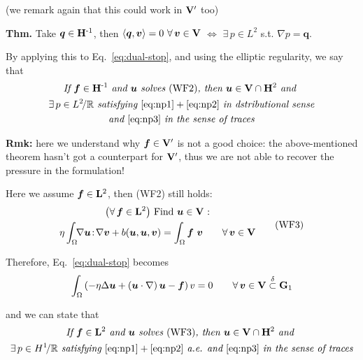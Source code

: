 {\color{blue}(we remark again that this could work in $\mathbf{V}'$ too)}

\smallskip

\textbf{Thm.} Take $\bm q\in\mathbf{H}^{\text{-}1}$, then $\left\langle \bm q,\bm v \right\rangle=0\ \forall\,\bm v\in\mathbf{V}$ $\Longleftrightarrow$ $\exists\,p\in L^2$ s.t. $\nabla p=\bm q$.

\smallskip

By applying this to Eq.~\eqref{eq:dual-stop}, and using the elliptic regularity, we say that
\begin{gather*}
\textit{If }\bm f\in\mathbf{H}^{\text{-}1} \textit{ and } \bm u \textit{ solves } \text{(WF2)} \textit{, then } \bm u\in \mathbf{V}\cap\mathbf{H}^2 \textit{ and } \\
\exists\, p\in L^2\!/\mathbb{R} \textit{ satisfying } \eqref{eq:np1}+\eqref{eq:np2}\textit{ in dstributional sense} \\
\textit{and } \eqref{eq:np3} \textit{ in the sense of traces}
\end{gather*}

{\color{blue}\textbf{Rmk:} here we understand why $\bm f\in \mathbf{V}'$ is not a good choice: the above-mentioned theorem hasn't got a counterpart for $\mathbf{V}'$, thus we are not able to recover the pressure in the formulation!}

\noindent\rlap{\rule[1.5ex]{0.495\textwidth}{.2pt}}\vspace{-0.5em}

\newcolumn

Here we assume $\bm f\in\mathbf{L}^2$, then (WF2) still holds:
\begin{equation*}
\begin{gathered}
\big(\forall\,\bm f\in\mathbf{L}^{2}\big)\text{ Find }\bm u\in \mathbf{V}\text{ :} \\ 
\eta\int_\Omega\!\! \nabla \bm u\! :\! \nabla \bm v+b(\bm u,\bm u,\bm v)=\int_\Omega\bm f\ \bm v \qquad \forall\, \bm v\in\mathbf{V}    
\end{gathered}
\tag{WF3}
\end{equation*}

Therefore, Eq.~\eqref{eq:dual-stop} becomes
\begin{equation*}
\int_\Omega \left( -\eta\Delta\bm u+ \left( \bm u\cdot\nabla \right) \bm u - \bm f \right) v =0 \qquad\forall\,\bm v\in \mathbf{V} \overset{\delta}{\subset} \mathbf{G}_1
\end{equation*}

and we can state that
\begin{gather*}
\textit{If }\bm f\in\mathbf{L}^2 \textit{ and } \bm u \textit{ solves } \text{(WF3)} \textit{, then } \bm u\in \mathbf{V}\cap\mathbf{H}^2 \textit{ and } \\
\exists\, p\in H^1\!/\mathbb{R} \textit{ satisfying } \eqref{eq:np1}+\eqref{eq:np2}\textit{ a.e. and } \eqref{eq:np3} \textit{ in the sense of traces}
\end{gather*}

